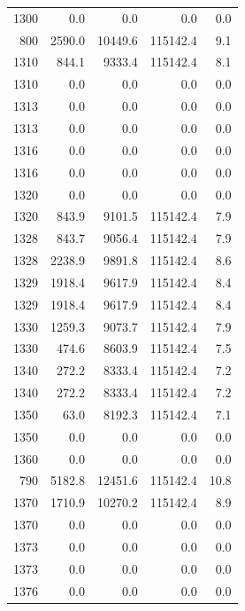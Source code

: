 \begin{longtable}{rrrrr}
    1300 & \num{0.0} & \num{0.0} & \num{0.0} & 0.0 \\
    800 & \num{2590.0} & \num{10449.6} & \num{115142.4} & 9.1 \\
    1310 & \num{844.1} & \num{9333.4} & \num{115142.4} & 8.1 \\
    1310 & \num{0.0} & \num{0.0} & \num{0.0} & 0.0 \\
    1313 & \num{0.0} & \num{0.0} & \num{0.0} & 0.0 \\
    1313 & \num{0.0} & \num{0.0} & \num{0.0} & 0.0 \\
    1316 & \num{0.0} & \num{0.0} & \num{0.0} & 0.0 \\
    1316 & \num{0.0} & \num{0.0} & \num{0.0} & 0.0 \\
    1320 & \num{0.0} & \num{0.0} & \num{0.0} & 0.0 \\
    1320 & \num{843.9} & \num{9101.5} & \num{115142.4} & 7.9 \\
    1328 & \num{843.7} & \num{9056.4} & \num{115142.4} & 7.9 \\
    1328 & \num{2238.9} & \num{9891.8} & \num{115142.4} & 8.6 \\
    1329 & \num{1918.4} & \num{9617.9} & \num{115142.4} & 8.4 \\
    1329 & \num{1918.4} & \num{9617.9} & \num{115142.4} & 8.4 \\
    1330 & \num{1259.3} & \num{9073.7} & \num{115142.4} & 7.9 \\
    1330 & \num{474.6} & \num{8603.9} & \num{115142.4} & 7.5 \\
    1340 & \num{272.2} & \num{8333.4} & \num{115142.4} & 7.2 \\
    1340 & \num{272.2} & \num{8333.4} & \num{115142.4} & 7.2 \\
    1350 & \num{63.0} & \num{8192.3} & \num{115142.4} & 7.1 \\
    1350 & \num{0.0} & \num{0.0} & \num{0.0} & 0.0 \\
    1360 & \num{0.0} & \num{0.0} & \num{0.0} & 0.0 \\
    790 & \num{5182.8} & \num{12451.6} & \num{115142.4} & 10.8 \\
    1370 & \num{1710.9} & \num{10270.2} & \num{115142.4} & 8.9 \\
    1370 & \num{0.0} & \num{0.0} & \num{0.0} & 0.0 \\
    1373 & \num{0.0} & \num{0.0} & \num{0.0} & 0.0 \\
    1373 & \num{0.0} & \num{0.0} & \num{0.0} & 0.0 \\
    1376 & \num{0.0} & \num{0.0} & \num{0.0} & 0.0 \\

\end{longtable}
